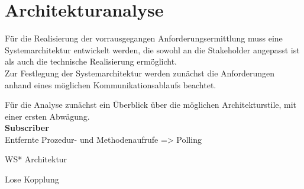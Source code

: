 
\section{Architekturanalyse}

Für die Realisierung der vorrausgegangen Anforderungsermittlung muss eine Systemarchitektur entwickelt werden, die sowohl an die Stakeholder angepasst ist als auch die technische Realisierung ermöglicht.\\

Zur Festlegung der Systemarchitektur werden zunächst die Anforderungen anhand eines möglichen Kommunikationsablaufs beachtet.

Für die Analyse zunächst ein Überblick über die möglichen Architekturstile, mit einer ersten Abwägung.\\

\textbf{Subscriber}\\


Entfernte Prozedur- und Methodenaufrufe => Polling

WS* Architektur


Lose Kopplung
